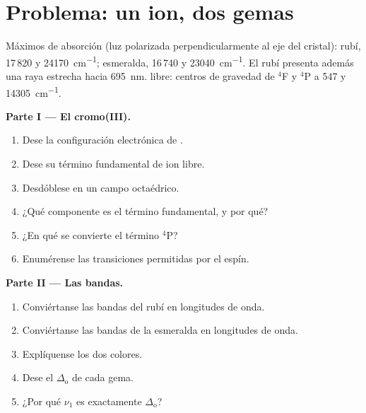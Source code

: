 \section{Problema: un ion, dos gemas}

\begin{problem}
\label{pb:b3:complex-spectra-magnetism:1}
Máximos de absorción (luz polarizada perpendicularmente al eje del cristal): rubí,
17\,820 y \qty{24170}{cm^{-1}}; esmeralda, 16\,740 y \qty{23040}{cm^{-1}}. El rubí presenta además una
raya estrecha hacia \qty{695}{nm}.  libre: centros de gravedad de $^4$F y $^4$P a 547 y \qty{14305}{cm^{-1}}.

\medskip\noindent\textbf{Parte I --- El cromo(III).}
\begin{enumerate}
  \item Dese la configuración electrónica de .
  \item Dese su término fundamental de ion libre.
  \item Desdóblese en un campo octaédrico.
  \item ¿Qué componente es el término fundamental, y por qué?
  \item ¿En qué se convierte el término $^4$P?
  \item Enumérense las transiciones permitidas por el espín.
\end{enumerate}

\medskip\noindent\textbf{Parte II --- Las bandas.}
\begin{enumerate}[resume]
  \item Conviértanse las bandas del rubí en longitudes de onda.
  \item Conviértanse las bandas de la esmeralda en longitudes de onda.
  \item Explíquense los dos colores.
  \item Dese el $\Delta_{\mathrm o}$ de cada gema.
  \item ¿Por qué $\nu_1$ es exactamente $\Delta_{\mathrm o}$?
\end{enumerate}


\end{problem}
